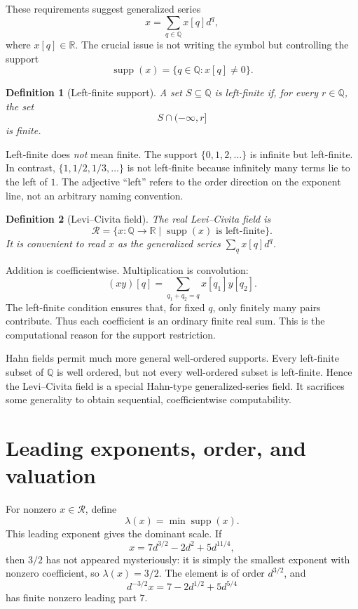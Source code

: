 \documentclass[11pt,a4paper]{article}
\newtheorem{definition}{Definition}[section]
\theoremstyle{remark}
\newcommand{\LC}{\mathcal R}
\newcommand{\supp}{\operatorname{supp}}
\newcommand{\R}{\mathbb R}
\newcommand{\Q}{\mathbb Q}
\begin{document}
These requirements suggest generalized series
\[
x=\sum_{q\in\Q}x[q]d^q,
\]
where $x[q]\in\R$. The crucial issue is not writing the symbol but controlling the support
\[
\supp(x)=\{q\in\Q:x[q]\ne0\}.
\]

\begin{definition}[Left-finite support]
A set $S\subseteq\Q$ is left-finite if, for every $r\in\Q$, the set
\[
S\cap(-\infty,r]
\]
is finite.
\end{definition}

Left-finite does \emph{not} mean finite. The support $\{0,1,2,\ldots\}$ is infinite but
left-finite. In contrast, $\{1,1/2,1/3,\ldots\}$ is not left-finite because infinitely many
terms lie to the left of $1$. The adjective ``left'' refers to the order direction on the
exponent line, not an arbitrary naming convention.

\begin{definition}[Levi--Civita field]
The real Levi--Civita field is
\[
\LC=\{x:\Q\to\R\mid\supp(x)\text{ is left-finite}\}.
\]
It is convenient to read $x$ as the generalized series $\sum_q x[q]d^q$.
\end{definition}

Addition is coefficientwise. Multiplication is convolution:
\[
(xy)[q]=\sum_{q_1+q_2=q}x[q_1]y[q_2].
\]
The left-finite condition ensures that, for fixed $q$, only finitely many pairs contribute.
Thus each coefficient is an ordinary finite real sum. This is the computational reason for the
support restriction.

Hahn fields permit much more general well-ordered supports. Every left-finite subset of $\Q$ is
well ordered, but not every well-ordered subset is left-finite. Hence the Levi--Civita field is a
special Hahn-type generalized-series field. It sacrifices some generality to obtain sequential,
coefficientwise computability.

\section{Leading exponents, order, and valuation}

For nonzero $x\in\LC$, define
\[
\lambda(x)=\min\supp(x).
\]
This leading exponent gives the dominant scale. If
\[
x=7d^{3/2}-2d^2+5d^{11/4},
\]
then $3/2$ has not appeared mysteriously: it is simply the smallest exponent with nonzero
coefficient, so $\lambda(x)=3/2$. The element is of order $d^{3/2}$, and
\[
d^{-3/2}x=7-2d^{1/2}+5d^{5/4}
\]
has finite nonzero leading part $7$.
\end{document}
